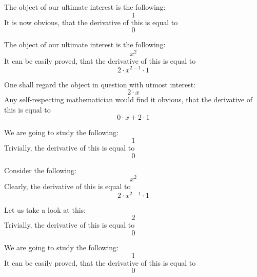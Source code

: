 \documentclass{article}
\begin{document}
The object of our ultimate interest is the following:
\begin{equation}
1 
\end{equation}
It is now obvious, that the derivative of this is equal to
\begin{equation}
0 
\end{equation}

The object of our ultimate interest is the following:
\begin{equation}
x ^{2 } 
\end{equation}
It can be easily proved, that the derivative of this is equal to
\begin{equation}
2 \cdot x ^{2 - 1 } \cdot 1 
\end{equation}

One shall regard the object in question with utmost interest:
\begin{equation}
2 \cdot x 
\end{equation}
Any self-respecting mathematician would find it obvious, that the derivative of this is equal to
\begin{equation}
0 \cdot x + 2 \cdot 1 
\end{equation}

We are going to study the following:
\begin{equation}
1 
\end{equation}
Trivially, the derivative of this is equal to
\begin{equation}
0 
\end{equation}

Consider the following:
\begin{equation}
x ^{2 } 
\end{equation}
Clearly, the derivative of this is equal to
\begin{equation}
2 \cdot x ^{2 - 1 } \cdot 1 
\end{equation}

Let us take a look at this:
\begin{equation}
2 
\end{equation}
Trivially, the derivative of this is equal to
\begin{equation}
0 
\end{equation}

We are going to study the following:
\begin{equation}
1 
\end{equation}
It can be easily proved, that the derivative of this is equal to
\begin{equation}
0 
\end{equation}
\end{document}
